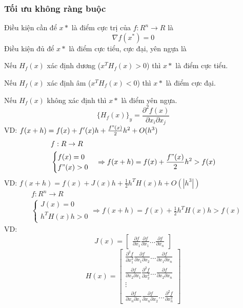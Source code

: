\subsubsection{Tối ưu không ràng buộc}
Điều kiện cần để $x*$ là điểm cực trị của $f:R^n\rightarrow R$ là
\begin{equation*}
    \nabla f(x^*) = 0
\end{equation*}
Điều kiện đủ để $x*$ là điểm cực tiểu, cực đại, yên ngựa là

Nếu $H_f(x)$ xác định dương ($x^TH_f(x) > 0$) thì $x*$ là điểm cực tiểu.

Nếu $H_f(x)$ xác định âm ($x^TH_f(x) < 0$) thì $x*$ là điểm cực đại. 

Nếu $H_f(x)$ không xác định thì $x*$ là điểm yên ngựa. 
\begin{equation*}
    \{H_f(x)\}_y = \frac{\partial^2 f(x)}{\partial x_i \partial x_j}
\end{equation*}
VD: $f(x+h) = f(x) + f'(x)h + \frac{f"(x)}{2} h^2 + O(h^3)$
\begin{align*}
    &f: R \rightarrow R\\
    &\begin{cases}
        f(x) = 0\\
        f"(x) > 0
    \end{cases} \Rightarrow f(x+h) = f(x) + \frac{f"(x)}{2}h^2 > f(x)
\end{align*}
VD: $f(x+h) = f(x) + J(x)h + \frac{1}{2}h^TH(x)h + O(|h^3|)$
\begin{align*}
    &f: R^n \rightarrow R\\
    &\begin{cases}
        J(x) = 0\\
        h^TH(x)h > 0
    \end{cases} \Rightarrow f(x+h) = f(x) + \frac{1}{2}h^TH(x)h > f(x)
\end{align*}
VD: \begin{equation*}
    J(x) = \begin{bmatrix}
        \frac{\partial f}{\partial x_1} \frac{\partial f}{\partial x_1} \ldots \frac{\partial f}{\partial x_n}
    \end{bmatrix}
\end{equation*}
\begin{equation*}
    H(x) = \begin{bmatrix}
        \frac{\partial^2 f}{\partial x_1^2} \frac{\partial f}{\partial x_1\partial x_2} \ldots \frac{\partial f}{\partial x_1\partial x_n}\\
        \frac{\partial f}{\partial x_2\partial x_1} \frac{\partial^2 f}{\partial x_2^2}\ldots \frac{\partial f}{\partial x_2\partial x_n}\\
        \vdots\\
        \frac{\partial f}{\partial x_n\partial x_1} \frac{\partial f}{\partial x_n\partial x_2} \ldots \frac{\partial^2 f}{\partial x_n^2}
    \end{bmatrix}
\end{equation*}

